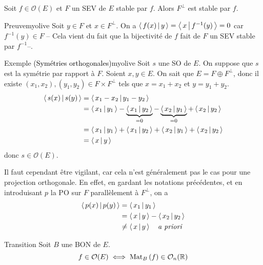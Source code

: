     \begin{prop}{}{}
        Soit $f \in \mathcal{O}(E)$ et $F$ un SEV de $E$ stable par $f$. Alors $F^{\perp}$ est stable par $f$.
    \end{prop}

    \begin{demo}{Preuve}{myolive}
        Soit $y \in F$ et $x \in F^{\perp}$. On a $\left<\,f(x)\,\middle|\,y\,\right> = \left<\,x\,\middle|\,f^{-1}(y)\,\right> = 0$ car $f^{-1}(y) \in F$ -- Cela vient du fait que la bijectivité de $f$ fait de $F$ un SEV stable par $f^{-1}$--. 
    \end{demo}

    \begin{omed}{Exemple \textcolor{black}{(Symétries orthogonales)}}{myolive}
        Soit $s$ une SO de $E$. On suppose que $s$ est la symétrie par rapport à $F$. Soient $x,y \in E$. On sait que $E = F \oplus F^{\perp}$, donc il existe $(x_1,x_2), (y_1,y_2) \in F \times F^{\perp}$ tels que $x = x_1 + x_2$ et $y = y_1 + y_2$. 
        \begin{align*}
            \left<\,s(x)\,\middle|\,s(y)\,\right>
            &= \left<\,x_1 - x_2\,\middle|\,y_1 - y_2\,\right> \\
            &= \left<\,x_1\,\middle|\,y_1\,\right> - \underbrace{\left<\,x_1\,\middle|\,y_2\,\right>}_{=0} - \underbrace{\left<\,x_2\,\middle|\,y_1\,\right>}_{=0} + \left<\,x_2\,\middle|\,y_2\,\right> \\
            &= \left<\,x_1\,\middle|\,y_1\,\right> + \left<\,x_1\,\middle|\,y_2\,\right> + \left<\,x_2\,\middle|\,y_1\,\right> + \left<\,x_2\,\middle|\,y_2\,\right> \\
            &= \left<\,x\,\middle|\,y\,\right>
        \end{align*}
        donc $s \in \mathcal{O}(E)$.
    \end{omed}

    Il faut cependant être vigilant, car cela n’est généralement pas le cas pour une projection orthogonale. En effet, en gardant les notations précédentes, et en introduisant $p$ la PO sur $F$ parallèlement à $F^{\perp}$, on a 
    \begin{align*}
        \left<\,p(x)\,\middle|\,p(y)\,\right> 
        &= \left<\,x_1\,\middle|\,y_1\,\right> \\
        &= \left<\,x\,\middle|\,y\,\right> - \left<\,x_2\,\middle|\,y_2\,\right> \\
        &\neq \left<\,x\,\middle|\,y\,\right> \quad \textit{a priori}
    \end{align*}

    \begin{theo}{Transition}{}
        Soit $B$ une BON de $E$. 
        \[ f \in \mathcal{O}(E) \iff \text{Mat}_{B}\left(f\right) \in \mathcal{O}_n(\mathbb{R}) \]
    \end{theo}

